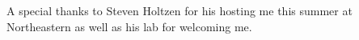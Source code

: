 \documentclass{./thesis-note}
\begin{document}
A special thanks to Steven Holtzen for his hosting me this summer at
Northeastern as well as his lab for welcoming me.
\vspace{\fill}

\subtitle{}
\title{}
\author{}
\contact{}
\date{}

\doublespacing
{}
\onehalfspacing
{}



\end{document}
